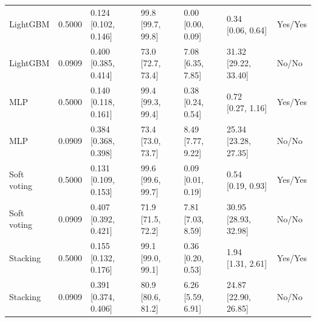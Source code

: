 \begin{table}[htbp]
{\begin{tabular}{lllllll}
LightGBM & 0.5000 & \shortstack{{0.124} \\ {[0.102, 0.146]}} & \shortstack{{99.8} \\ {[99.7, 99.8]}} & \shortstack{{0.00} \\ {[0.00, 0.09]}} & \shortstack{{0.34} \\ {[0.06, 0.64]}} & Yes/Yes \\
LightGBM & 0.0909 & \shortstack{{0.400} \\ {[0.385, 0.414]}} & \shortstack{{73.0} \\ {[72.7, 73.4]}} & \shortstack{{7.08} \\ {[6.35, 7.85]}} & \shortstack{{31.32} \\ {[29.22, 33.40]}} & No/No \\
MLP & 0.5000 & \shortstack{{0.140} \\ {[0.118, 0.161]}} & \shortstack{{99.4} \\ {[99.3, 99.4]}} & \shortstack{{0.38} \\ {[0.24, 0.54]}} & \shortstack{{0.72} \\ {[0.27, 1.16]}} & Yes/Yes \\
MLP & 0.0909 & \shortstack{{0.384} \\ {[0.368, 0.398]}} & \shortstack{{73.4} \\ {[73.0, 73.7]}} & \shortstack{{8.49} \\ {[7.77, 9.22]}} & \shortstack{{25.34} \\ {[23.28, 27.35]}} & No/No \\
Soft voting & 0.5000 & \shortstack{{0.131} \\ {[0.109, 0.153]}} & \shortstack{{99.6} \\ {[99.6, 99.7]}} & \shortstack{{0.09} \\ {[0.01, 0.19]}} & \shortstack{{0.54} \\ {[0.19, 0.93]}} & Yes/Yes \\
Soft voting & 0.0909 & \shortstack{{0.407} \\ {[0.392, 0.421]}} & \shortstack{{71.9} \\ {[71.5, 72.2]}} & \shortstack{{7.81} \\ {[7.03, 8.59]}} & \shortstack{{30.95} \\ {[28.93, 32.98]}} & No/No \\
Stacking & 0.5000 & \shortstack{{0.155} \\ {[0.132, 0.176]}} & \shortstack{{99.1} \\ {[99.0, 99.1]}} & \shortstack{{0.36} \\ {[0.20, 0.53]}} & \shortstack{{1.94} \\ {[1.31, 2.61]}} & Yes/Yes \\
Stacking & 0.0909 & \shortstack{{0.391} \\ {[0.374, 0.406]}} & \shortstack{{80.9} \\ {[80.6, 81.2]}} & \shortstack{{6.26} \\ {[5.59, 6.91]}} & \shortstack{{24.87} \\ {[22.90, 26.85]}} & No/No \\
\bottomrule
\end{tabular}
}
\end{table}
